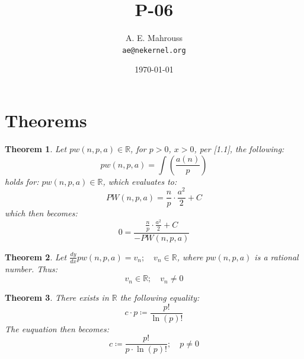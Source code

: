 \documentclass[11pt, a4paper]{article}
\title{P-06}
\author{A. E. Mahrouss\\\texttt{ae@nekernel.org}}
\date{\today}
\theoremstyle{plain}
\newtheorem{theorem}{Theorem}[section]
\theoremstyle{definition}
\theoremstyle{remark}
\begin{document}
\twocolumn[{%
  \maketitle
  \vspace{-0.5em}
  \vspace{0.8em}
  \rule{\linewidth}{0.4pt}
  \vspace{1em}
}]

\maketitle

\section{Theorems}

\begin{theorem}
  Let $pw(n, p, a) \in \mathbb{R}$, for $p > 0$, $x > 0$, per [1.1], the following:
  \begin{equation}
    pw(n, p, a) = \int (\frac{a(n)}{p})
  \end{equation}
  holds for: $pw(n, p, a) \in \mathbb{R}$, which evaluates to:
  \begin{equation}
    PW(n, p, a) = \frac{n}{p}\cdot \frac{a^2}{2}+C
  \end{equation}
  which then becomes:
  \begin{equation}
    0 = \frac{\frac{n}{p}\cdot \frac{a^2}{2}+C}{-PW(n, p, a)}
  \end{equation}
\end{theorem}

\begin{theorem}
  Let $\frac{dy}{dx}pw(n, p, a) = v_{n}; \quad v_{n} \in \mathbb{R}$, where $ pw(n, p, a) $ is a rational number. Thus:
  \begin{equation}
    v_{n} \in \mathbb{R}; \quad v_{n}\neq 0
  \end{equation}
\end{theorem}

\begin{theorem}
  There exists  in $\mathbb{R}$ the following equality:
  \begin{equation}
    c \cdot p \coloneq \frac{p!}{\ln \left(p\right)!}
  \end{equation}
  The euquation then becomes:
  \begin{equation}
    c \coloneq \frac{p!}{p \cdot \ln \left(p\right)!}; \quad p \neq 0
  \end{equation}
\end{theorem}
\end{document}
